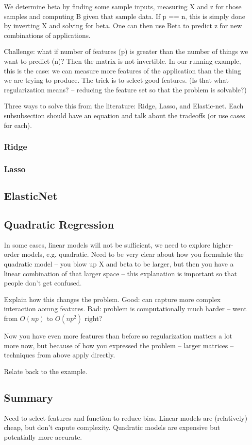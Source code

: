 We determine beta by finding some sample inputs, measuring X and z for
those samples and computing B given that sample data.  If p == n, this
is simply done by inverting X and solving for beta.  One can then use
Beta to predict z for new combinations of applications.

Challenge: what if number of features (p) is greater than the number
of things we want to predict (n)?  Then the matrix is not invertible.
In our running example, this is the case: we can measure more features
of the application than the thing we are trying to produce.  The trick
is to select good features.  (Is that what regularization means? --
reducing the feature set so that the problem is solvable?)

Three ways to solve this from the literature: Ridge, Lasso, and
Elastic-net.  Each subsubsection should have an equation and talk
about the tradeoffs (or use cases for each).

\subsubsection{Ridge}

\subsubsection{Lasso}

\subsection{ElasticNet}


\subsection{Quadratic Regression}
In some cases, linear models will not be sufficient, we need to
explore higher-order models, e.g. quadratic.  Need to be very clear
about how you formulate the quadratic model -- you blow up X and beta
to be larger, but then you have a linear combination of that larger
space -- this explanation is important so that people don't get
confused.

Explain how this changes the problem.  Good: can capture more complex
interaction aomng features.  Bad: problem is computationally much
harder -- went from $O(np)$ to $O(np^2)$ right?

Now you have even more features than before so regularization matters
a lot more now, but because of how you expressed the problem -- larger
matrices -- techniques from above apply directly.

Relate back to the example.

\subsection{Summary}

Need to select features and function to reduce bias.  Linear models
are (relatively) cheap, but don't capute complexity.  Quadratic models
are expensive but potentially more accurate.
